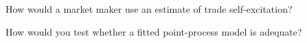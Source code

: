\begin{interviewq}\label{iq:qm:point-processes-and-hawkes-processes:5}
How would a market maker use an estimate of trade self-excitation?
\end{interviewq}

\begin{interviewq}\label{iq:qm:point-processes-and-hawkes-processes:6}
How would you test whether a fitted point-process model is adequate?
\end{interviewq}
